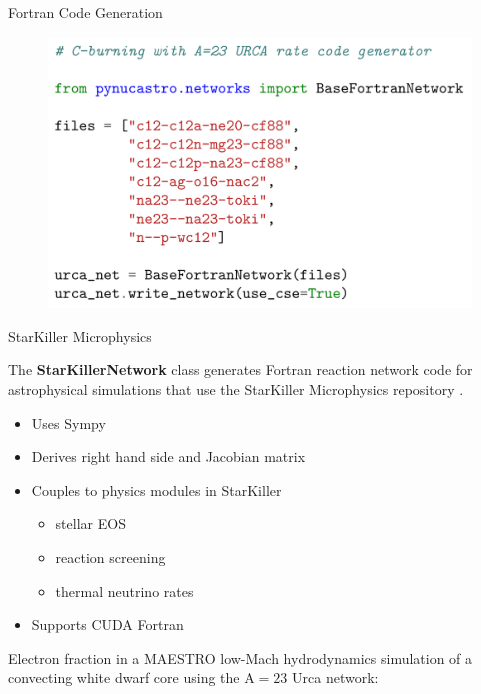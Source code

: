 \documentclass[final]{beamer}
\newlength{\onecolwid}
\newlength{\twocolwid}
\newcommand{\isot}[2]{$^{#2}\mathrm{#1}$}
\begin{document}
\begin{frame}[t]
\begin{columns}[t]
\begin{column}{\twocolwid}
\begin{columns}[t,totalwidth=\twocolwid]
\begin{column}{\onecolwid}
\begin{block}{Fortran Code Generation}
\begin{figure}
\includegraphics[width=0.8\linewidth]{figures/basefortran-network/basefortrannetwork.png}
\end{figure}

\end{block}


\begin{block}{StarKiller Microphysics}

The \textbf{StarKillerNetwork} class generates Fortran reaction
network code for astrophysical simulations that use the StarKiller
Microphysics repository \cite{Zingale.astronum.2017}.

\begin{itemize}
    \item Uses Sympy \cite{SymPy.2017}
    \item Derives right hand side and Jacobian matrix
    \item Couples to physics modules in StarKiller
    \begin{itemize}
        \item stellar EOS
        \item reaction screening
        \item thermal neutrino rates
    \end{itemize}
    \item Supports CUDA Fortran
\end{itemize}

Electron fraction in a MAESTRO low-Mach hydrodynamics simulation of a
convecting white dwarf core using the $\mathrm{A=23}$ Urca network:


\end{block}
\end{column}
\end{columns}
\end{column}
\end{columns}
\end{frame}
\end{document}
